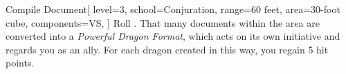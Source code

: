 \documentclass[theme=dnd]{rpgcard}
\begin{document}
	\begin{RpgSpell}{Compile Document}[
			level=3,
			school=Conjuration,
			range={60 feet},
			area={30-foot cube},
			components=VS,
		]
		Roll . That many documents within the area are converted into a \textit{Powerful Dragon Format}, which acts on its own initiative and regards you as an ally. For each dragon created in this way, you regain 5 hit points.

	\end{RpgSpell}
\end{document}
